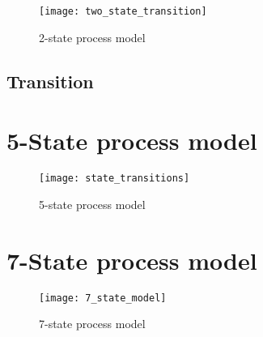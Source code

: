 \begin{figure}[htbp]
  \centering
  \texttt{[image: two\_state\_transition]}
  \caption{2-state process model}
  \label{fig:2-state-process-model}
\end{figure}

\subsection{Transition}


\section{5-State process model}

\begin{figure}[htbp]
  \centering
  \texttt{[image: state\_transitions]}
  \caption{5-state process model}
  \label{fig:5-state-process-model}
\end{figure}

\section{7-State process model}

\begin{figure}[htbp]
  \centering
  \texttt{[image: 7\_state\_model]}
  \caption{7-state process model}
  \label{fig:7-state-process-model}
\end{figure}

